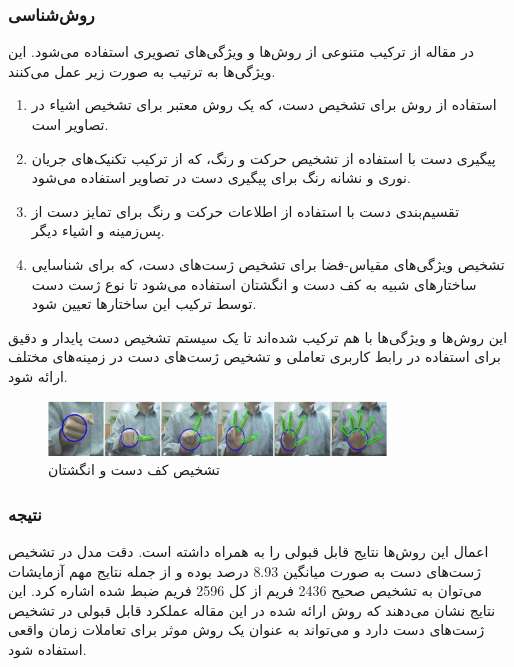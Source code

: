 \subsubsection{روش‌شناسی}
در مقاله از ترکیب متنوعی از روش‌ها و ویژگی‌های تصویری استفاده می‌شود. این ویژگی‌ها به ترتیب به صورت زیر عمل می‌کنند.
\begin{enumerate}
    \item استفاده از روش  برای تشخیص دست، که یک روش معتبر برای تشخیص اشیاء در تصاویر است.
    \item پیگیری دست با استفاده از تشخیص حرکت و رنگ، که از ترکیب تکنیک‌های جریان نوری و نشانه رنگ برای پیگیری دست در تصاویر استفاده می‌شود.
    \item تقسیم‌بندی دست با استفاده از اطلاعات حرکت و رنگ برای تمایز دست از پس‌زمینه و اشیاء دیگر. 
    \item تشخیص ویژگی‌های مقیاس-فضا برای تشخیص ژست‌های دست، که برای شناسایی ساختارهای شبیه به کف دست و انگشتان استفاده می‌شود تا نوع ژست دست توسط ترکیب این ساختارها تعیین شود.
\end{enumerate}
  این روش‌ها و ویژگی‌ها با هم ترکیب شده‌اند تا یک سیستم تشخیص دست پایدار و دقیق برای استفاده در رابط کاربری تعاملی و تشخیص ژست‌های دست در زمینه‌های مختلف ارائه شود.

\begin{figure}[h]
    \centering
    \includegraphics[width=0.8\textwidth]{hand_gesture_feature.png}
    \caption{تشخیص کف دست و انگشتان}
\end{figure}

\subsubsection{نتیجه}
اعمال این روش‌ها نتایج قابل قبولی را به همراه داشته است. دقت مدل در تشخیص ژست‌های دست به صورت میانگین 8.93 درصد بوده و از جمله نتایج مهم آزمایشات می‌توان به تشخیص 
صحیح 2436 فریم از کل 2596 فریم ضبط شده اشاره کرد. این نتایج نشان می‌دهند که روش ارائه شده در این مقاله عملکرد قابل قبولی در تشخیص ژست‌های دست دارد و 
می‌تواند به عنوان یک روش موثر برای تعاملات زمان واقعی استفاده شود.
\cite{fang2007real}



